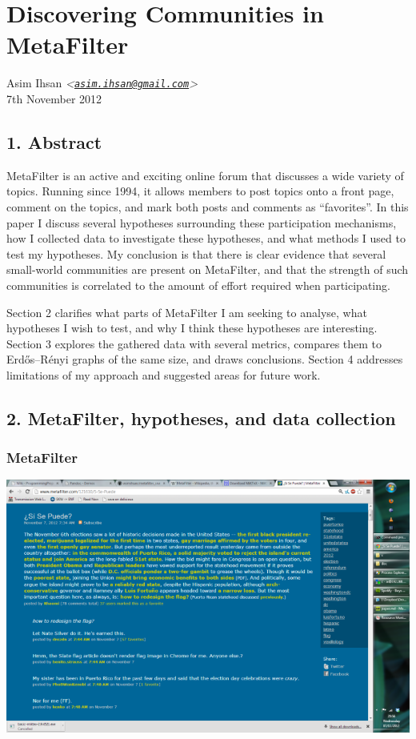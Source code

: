 \usepackage{fullpage}

\section{Discovering Communities in MetaFilter}

Asim Ihsan
\emph{\textless{}\href{mailto:asim.ihsan@gmail.com}{\texttt{asim.ihsan@gmail.com}}\textgreater{}}\\7th
November 2012

\subsection{1. Abstract}

MetaFilter is an active and exciting online forum that discusses a wide
variety of topics. Running since 1994, it allows members to post topics
onto a front page, comment on the topics, and mark both posts and
comments as ``favorites''. In this paper I discuss several hypotheses
surrounding these participation mechanisms, how I collected data to
investigate these hypotheses, and what methods I used to test my
hypotheses. My conclusion is that there is clear evidence that several
small-world communities are present on MetaFilter, and that the strength
of such communities is correlated to the amount of effort required when
participating.

Section 2 clarifies what parts of MetaFilter I am seeking to analyse,
what hypotheses I wish to test, and why I think these hypotheses are
interesting. Section 3 explores the gathered data with several metrics,
compares them to Erdős--Rényi graphs of the same size, and draws
conclusions. Section 4 addresses limitations of my approach and
suggested areas for future work.

\subsection{2. MetaFilter, hypotheses, and data collection}

\subsubsection{MetaFilter}

\includegraphics{01_metafilter_screenshot.png}~


